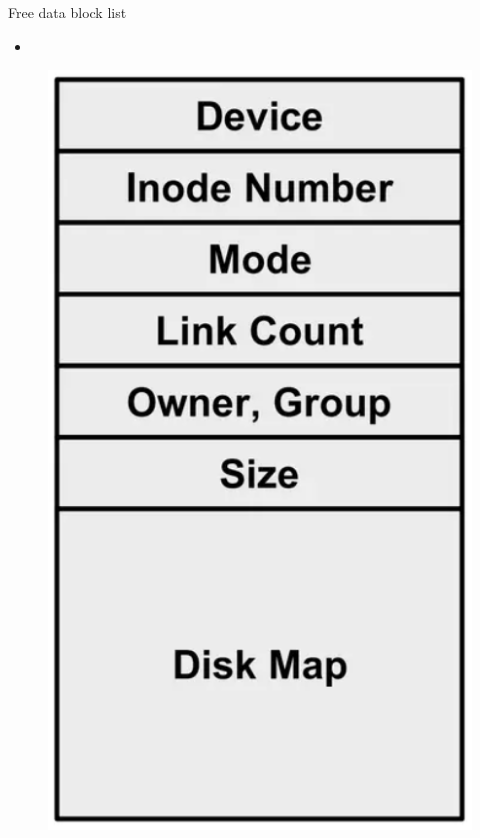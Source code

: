 \documentclass[xcolor=table]{beamer}
\begin{document}
    \begin{frame}[allowframebreaks]{Free data block list}
        \begin{itemize}
            \item
        \end{itemize}
        
        \framebreak
        
        \begin{figure}
            \centering
            \includegraphics[width=\textwidth,height=0.8\textheight,keepaspectratio]{images/inode1.png}
            \label{fig:inode1.png}
        \end{figure}
    \end{frame}
    
\end{document}
